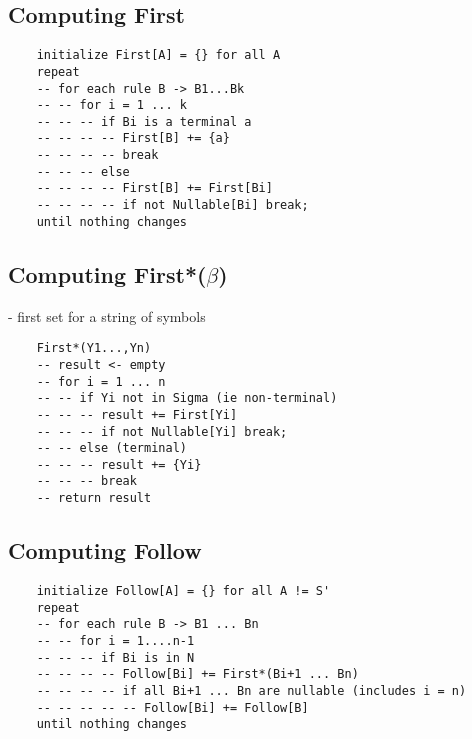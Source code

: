 \documentclass[12pt]{article}
\begin{document}
	\subsection*{Computing First}
	\begin{verbatim}
	initialize First[A] = {} for all A
	repeat
	-- for each rule B -> B1...Bk
	-- -- for i = 1 ... k
	-- -- -- if Bi is a terminal a
	-- -- -- -- First[B] += {a}
	-- -- -- -- break
	-- -- -- else
	-- -- -- -- First[B] += First[Bi]
	-- -- -- -- if not Nullable[Bi] break;
	until nothing changes
	\end{verbatim}
	
	\subsection*{Computing First*($\beta$)}
	- first set for a string of symbols\\
	\begin{verbatim}
	First*(Y1...,Yn)
	-- result <- empty
	-- for i = 1 ... n
	-- -- if Yi not in Sigma (ie non-terminal)
	-- -- -- result += First[Yi]
	-- -- -- if not Nullable[Yi] break;
	-- -- else (terminal)
	-- -- -- result += {Yi}
	-- -- -- break
	-- return result
	\end{verbatim}
	
	\subsection*{Computing Follow}
	\begin{verbatim}
	initialize Follow[A] = {} for all A != S'
	repeat
	-- for each rule B -> B1 ... Bn
	-- -- for i = 1....n-1
	-- -- -- if Bi is in N
	-- -- -- -- Follow[Bi] += First*(Bi+1 ... Bn)
	-- -- -- -- if all Bi+1 ... Bn are nullable (includes i = n)
	-- -- -- -- -- Follow[Bi] += Follow[B]
	until nothing changes
	\end{verbatim}
	
\end{document}
